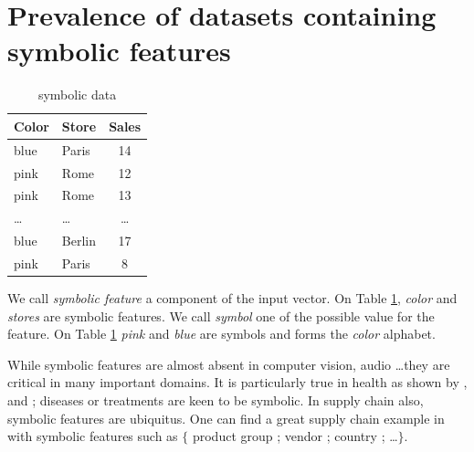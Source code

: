 \section{Prevalence of datasets containing symbolic features }\label{sec:review}


\begin{table}[h!]%
  \caption{symbolic data}
  \label{tab:catData}
  \begin{footnotesize}
  \begin{center}
  \begin{tabular}{llc}
    \toprule
    Color & Store & Sales \\
    \midrule
    blue  & Paris    & 14 \\
    pink  & Rome     & 12 \\
    pink  & Rome     & 13 \\
    \dots & \dots    & \dots \\
    blue  & Berlin     & 17 \\
    pink  & Paris     & 8  \\
  \bottomrule
\end{tabular}
\end{center}
\end{footnotesize}
\end{table}


\begin{Vocabulary*}
We call \textit{symbolic feature} a component of the input vector. On Table \ref{tab:catData}, \textit{color} and \textit{stores} are symbolic features. We call \textit{symbol} one of the possible value for the feature. On Table \ref{tab:catData} \textit{pink} and \textit{blue} are symbols and forms the \textit{color} alphabet.
\end{Vocabulary*}


While symbolic features are almost absent in computer vision, audio \dots they are critical in many important domains. It is particularly true in health as shown by \cite{PublicHealth}, \cite{HIV} and \cite{SPECT}; diseases or treatments are keen to be symbolic. In supply chain also, symbolic features are ubiquitus. One can find a great supply chain example in \cite{SCPricing} with symbolic features such as $\{$ product group ; vendor ; country ; \dots $\}$. 

